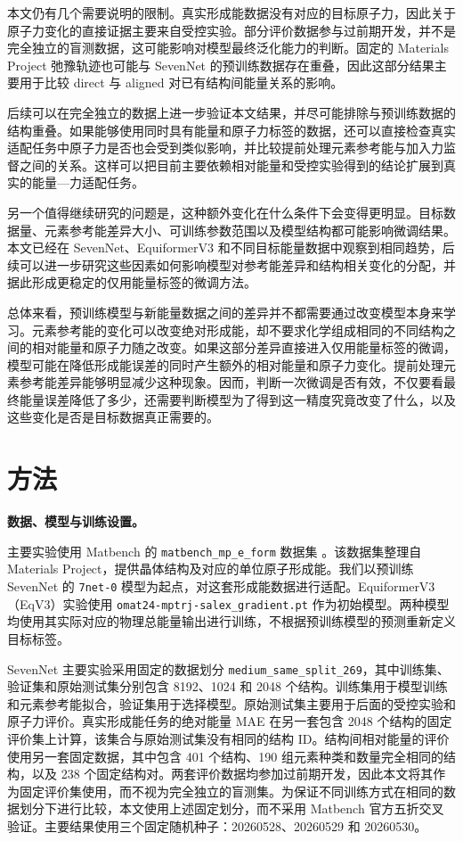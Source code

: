 \documentclass[UTF8,a4paper,12pt,fontset=fandol]{ctexart}
\begin{document}
本文仍有几个需要说明的限制。真实形成能数据没有对应的目标原子力，因此关于原子力变化的直接证据主要来自受控实验。部分评价数据参与过前期开发，并不是完全独立的盲测数据，这可能影响对模型最终泛化能力的判断。固定的 Materials Project 弛豫轨迹也可能与 SevenNet 的预训练数据存在重叠，因此这部分结果主要用于比较 direct 与 aligned 对已有结构间能量关系的影响。

后续可以在完全独立的数据上进一步验证本文结果，并尽可能排除与预训练数据的结构重叠。如果能够使用同时具有能量和原子力标签的数据，还可以直接检查真实适配任务中原子力是否也会受到类似影响，并比较提前处理元素参考能与加入力监督之间的关系。这样可以把目前主要依赖相对能量和受控实验得到的结论扩展到真实的能量—力适配任务。

另一个值得继续研究的问题是，这种额外变化在什么条件下会变得更明显。目标数据量、元素参考能差异大小、可训练参数范围以及模型结构都可能影响微调结果。本文已经在 SevenNet、EquiformerV3 和不同目标能量数据中观察到相同趋势，后续可以进一步研究这些因素如何影响模型对参考能差异和结构相关变化的分配，并据此形成更稳定的仅用能量标签的微调方法。

总体来看，预训练模型与新能量数据之间的差异并不都需要通过改变模型本身来学习。元素参考能的变化可以改变绝对形成能，却不要求化学组成相同的不同结构之间的相对能量和原子力随之改变。如果这部分差异直接进入仅用能量标签的微调，模型可能在降低形成能误差的同时产生额外的相对能量和原子力变化。提前处理元素参考能差异能够明显减少这种现象。因而，判断一次微调是否有效，不仅要看最终能量误差降低了多少，还需要判断模型为了得到这一精度究竟改变了什么，以及这些变化是否是目标数据真正需要的。

\section{方法}

\textbf{数据、模型与训练设置。}

主要实验使用 Matbench 的 \nolinkurl{matbench_mp_e_form} 数据集
\cite{dunn2020benchmarking}。该数据集整理自 Materials Project，提供晶体结构及对应的单位原子形成能。我们以预训练 SevenNet 的 \nolinkurl{7net-0} 模型为起点，对这套形成能数据进行适配\cite{park2024scalable}。EquiformerV3（EqV3）实验使用 \nolinkurl{omat24-mptrj-salex_gradient.pt} 作为初始模型\cite{liao2026equiformerv3}。两种模型均使用其实际对应的物理总能量输出进行训练，不根据预训练模型的预测重新定义目标标签。

SevenNet 主要实验采用固定的数据划分 \nolinkurl{medium_same_split_269}，其中训练集、验证集和原始测试集分别包含 8192、1024 和 2048 个结构。训练集用于模型训练和元素参考能拟合，验证集用于选择模型。原始测试集主要用于后面的受控实验和原子力评价。真实形成能任务的绝对能量 MAE 在另一套包含 2048 个结构的固定评价集上计算，该集合与原始测试集没有相同的结构 ID。结构间相对能量的评价使用另一套固定数据，其中包含 401 个结构、190 组元素种类和数量完全相同的结构，以及 238 个固定结构对。两套评价数据均参加过前期开发，因此本文将其作为固定评价集使用，而不视为完全独立的盲测集。为保证不同训练方式在相同的数据划分下进行比较，本文使用上述固定划分，而不采用 Matbench 官方五折交叉验证。主要结果使用三个固定随机种子：20260528、20260529 和 20260530。
\end{document}

